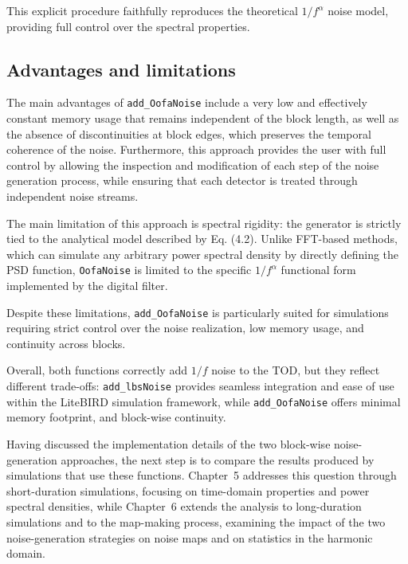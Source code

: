 This explicit procedure faithfully reproduces the theoretical $1/f^\alpha$ noise model, providing full control over the spectral properties.


\subsection{Advantages and limitations}
The main advantages of \texttt{add\_OofaNoise} include a very low and effectively constant memory usage that remains independent of the block length, as well as the absence of discontinuities at block edges, which preserves the temporal coherence of the noise. Furthermore, this approach provides the user with full control by allowing the inspection and modification of each step of the noise generation process, while ensuring that each detector is treated through independent noise streams.

The main limitation of this approach is spectral rigidity: the generator is strictly tied to the analytical model described by Eq. (4.2). Unlike FFT-based methods, which can simulate any arbitrary power spectral density by directly defining the PSD function, \texttt{OofaNoise} is limited to the specific $1/f^\alpha$ functional form implemented by the digital filter.

Despite these limitations, \texttt{add\_OofaNoise} is particularly suited for simulations requiring strict control over the noise realization, low memory usage, and continuity across blocks.

Overall, both functions correctly add $1/f$ noise to the TOD, but they reflect different trade-offs: \texttt{add\_lbsNoise} provides seamless integration and ease of use within the LiteBIRD simulation framework, while \texttt{add\_OofaNoise} offers minimal memory footprint, and block-wise continuity. 

Having discussed the implementation details of the two block-wise noise-generation approaches, the next step is to compare the results produced by simulations that use these functions. Chapter~5 addresses this question through short-duration simulations, focusing on time-domain properties and power spectral densities, while Chapter~6 extends the analysis to long-duration simulations and to the map-making process, examining the impact of the two noise-generation strategies on noise maps and on statistics in the harmonic domain.

